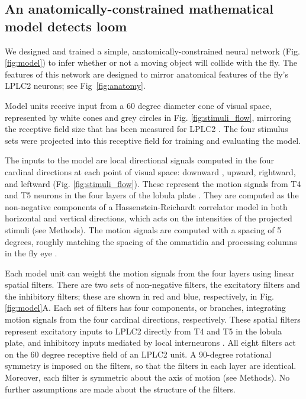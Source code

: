 \documentclass[pdftex,9pt,lineno]{elife}
\begin{document}

\subsection{An anatomically-constrained mathematical model detects loom}

We designed and trained a simple, anatomically-constrained neural network (Fig. \ref{fig:model}) to infer whether or not a moving object will collide with the fly. The features of this network are designed to mirror anatomical features of the fly's LPLC2 neurons; see Fig~\ref{fig:anatomy}.

Model units receive input from a 60 degree diameter cone of visual space, represented by white cones and grey circles in Fig. \ref{fig:stimuli_flow}, mirroring the receptive field size that has been measured for LPLC2 \citep{klapoetke2017ultra}. The four stimulus sets were projected into this receptive field for training and evaluating the model.

The inputs to the model are local directional signals computed in the four cardinal directions at each point of visual space: downward , upward, rightward, and leftward (Fig. \ref{fig:stimuli_flow}). These represent the motion signals from T4 and T5 neurons in the four layers of the lobula plate \citep{maisak2013directional}. They are computed as the non-negative components of a Hassenstein-Reichardt correlator model \citep{hassenstein1956systemtheoretische} in both horizontal and vertical directions, which acts on the intensities of the projected stimuli (see Methods). The motion signals are computed with a spacing of 5 degrees, roughly matching the spacing of the ommatidia and processing columns in the fly eye \citep{stavenga2003angular}. %

Each model unit can weight the motion signals from the four layers using linear spatial filters. There are two sets of non-negative filters, the excitatory filters and the inhibitory filters; these are shown in red and blue, respectively, in Fig. \ref{fig:model}A. Each set of filters has four components, or branches, integrating motion signals from the four cardinal directions, respectively. These spatial filters represent excitatory inputs to LPLC2 directly from T4 and T5 in the lobula plate, and inhibitory inputs  mediated by local interneurons \citep{klapoetke2017ultra,mauss2015neural}. All eight filters act on the 60 degree receptive field of an LPLC2 unit. A 90-degree rotational symmetry is imposed on the filters, so that the filters in each layer are identical. Moreover, each filter is symmetric about the axis of motion (see Methods). No further assumptions are made about the structure of the filters.
\end{document}
